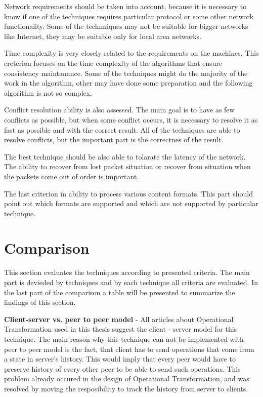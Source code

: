 \documentclass[12pt,oneside]{fithesis2}
\begin{document}
\par Network requirements should be taken into account, because it is necessary to know if one of the techniques requires particular protocol or some other network functionality. Some of the technniques may not be suitable for bigger networks like Internet, they may be suitable only for local area networks.
\par Time complexity is very closely related to the requirements on the machines. This creterion focuses on the time complexity of the algorithms that ensure consistency maintanance. Some of the techniques might do the majority of the work in the algorithm, other may have done some preparation and the following algorithm is not so complex.
\par Conflict resolution ability is also assessed. The main goal is to have as few conflicts as possible, but when some conflict occurs, it is necessary to resolve it as fast as possible and with the correct result. All of the techniques are able to resolve conflicts, but the important part is the correctnes of the result. 
\par The best technique should be also able to tolarate the latency of the network. The ability to recover from lost packet situation or recover from situation when the packets come out of order is important. 
\par The last criterion in ability to process various content formats. This part should point out which formats are supported and which are not supported by particular technique.
\section{Comparison}
\par This section evaluates the techniques according to presented criteria. The main part is devieded by techniques and by each technique all criteria are evaluated. In the last part of the comparison a table will be presented to summarize the findings of this section.
\\
\par \textbf{\underline{}}

\vspace{3mm}

\textbf{Client-server vs. peer to peer model} - All articles about Operational Transformation used in this thesis suggest the client - server model for this technique. The main reason why this technique can not be implemented with peer to peer model is the fact, that client has to send operations that come from a state in server's history. This would imply that every peer would have to preserve history of every other peer to be able to send such operations. This problem already occured in the design of Operational Transformation, and was resolved by moving the resposibility to track the history from server to clients.
\end{document}
